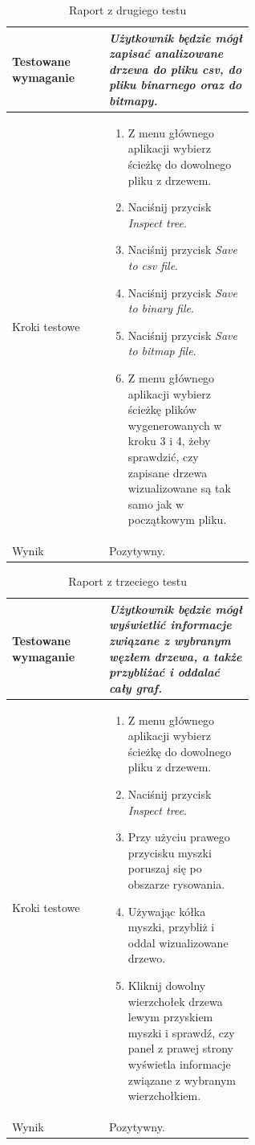 \documentclass{article}
\newcommand{\modulename}[1]{\textit{#1}}
\begin{document}
\begin{table}[h!]
	\centering
	\begin{tabular}{|l|p{0.6\linewidth}|}
		\hline
		Testowane wymaganie & \modulename{Użytkownik będzie mógł zapisać analizowane drzewa do pliku csv, do pliku binarnego oraz do bitmapy.} \\ \hline
		Kroki testowe & \begin{enumerate} \item Z menu głównego aplikacji wybierz ścieżkę do dowolnego pliku z drzewem. \item Naciśnij przycisk \modulename{Inspect tree}. \item Naciśnij przycisk \modulename{Save to csv file}. \item Naciśnij przycisk \modulename{Save to binary file}. \item Naciśnij przycisk \modulename{Save to bitmap file}. \item Z menu głównego aplikacji wybierz ścieżkę plików wygenerowanych w kroku 3 i 4, żeby sprawdzić, czy zapisane drzewa wizualizowane są tak samo jak w początkowym pliku. \end{enumerate} \\ \hline
		Wynik & Pozytywny. \\ \hline
	\end{tabular}
	\caption{Raport z drugiego testu}
	\label{tab:test2}
\end{table}

\clearpage

\begin{table}[h!]
	\centering
	\begin{tabular}{|l|p{0.6\linewidth}|}
		\hline
		Testowane wymaganie & \modulename{Użytkownik będzie mógł wyświetlić informacje związane z wybranym węzłem drzewa, a także przybliżać i oddalać cały graf.} \\ \hline
		Kroki testowe & \begin{enumerate} \item Z menu głównego aplikacji wybierz ścieżkę do dowolnego pliku z drzewem. \item Naciśnij przycisk \modulename{Inspect tree}. \item Przy użyciu prawego przycisku myszki poruszaj się po obszarze rysowania. \item Używając kółka myszki, przybliż i oddal wizualizowane drzewo. \item Kliknij dowolny wierzchołek drzewa lewym przyskiem myszki i sprawdź, czy panel z prawej strony wyświetla informacje związane z wybranym wierzchołkiem. \end{enumerate} \\ \hline
		Wynik & Pozytywny. \\ \hline
	\end{tabular}
	\caption{Raport z trzeciego testu}
	\label{tab:test3}
\end{table}
\end{document}
